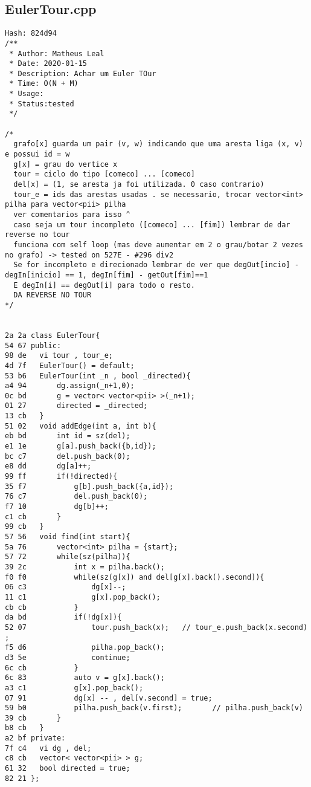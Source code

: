 \documentclass[11pt, a4paper, twoside]{article}
\begin{document}
\subsection{EulerTour.cpp}
\begin{lstlisting}
Hash: 824d94
/**
 * Author: Matheus Leal
 * Date: 2020-01-15
 * Description: Achar um Euler TOur
 * Time: O(N + M)
 * Usage: 
 * Status:tested
 */

/*
  grafo[x] guarda um pair (v, w) indicando que uma aresta liga (x, v) e possui id = w
  g[x] = grau do vertice x
  tour = ciclo do tipo [comeco] ... [comeco]
  del[x] = (1, se aresta ja foi utilizada. 0 caso contrario)
  tour_e = ids das arestas usadas . se necessario, trocar vector<int> pilha para vector<pii> pilha
  ver comentarios para isso ^
  caso seja um tour incompleto ([comeco] ... [fim]) lembrar de dar reverse no tour
  funciona com self loop (mas deve aumentar em 2 o grau/botar 2 vezes no grafo) -> tested on 527E - #296 div2
  Se for incompleto e direcionado lembrar de ver que degOut[incio] - degIn[inicio] == 1, degIn[fim] - getOut[fim]==1
  E degIn[i] == degOut[i] para todo o resto. 
  DA REVERSE NO TOUR
*/


2a 2a class EulerTour{	
54 67 public:
98 de 	vi tour , tour_e;
4d 7f 	EulerTour() = default;
53 b6 	EulerTour(int _n , bool _directed){ 
a4 94 		dg.assign(_n+1,0);
0c bd 		g = vector< vector<pii> >(_n+1);
01 27 		directed = _directed;
13 cb 	}
51 02 	void addEdge(int a, int b){
eb bd 		int id = sz(del);
e1 1e 		g[a].push_back({b,id});
bc c7 		del.push_back(0);
e8 dd 		dg[a]++;
99 ff 		if(!directed){
35 f7 			g[b].push_back({a,id});
76 c7 			del.push_back(0);
f7 10 			dg[b]++;
c1 cb 		}
99 cb 	}
57 56 	void find(int start){
5a 76 	    vector<int> pilha = {start};
57 72 	    while(sz(pilha)){
39 2c 	        int x = pilha.back();
f0 f0 	        while(sz(g[x]) and del[g[x].back().second]){
06 c3 	            dg[x]--;
11 c1 	            g[x].pop_back();
cb cb 	        }
da bd 	        if(!dg[x]){
52 07 	            tour.push_back(x); 	 // tour_e.push_back(x.second) ;
f5 d6 	            pilha.pop_back();
d3 5e 	            continue;
6c cb 	        }
6c 83 	        auto v = g[x].back();
a3 c1 	        g[x].pop_back();
07 91 	        dg[x] -- , del[v.second] = true;
59 b0 	        pilha.push_back(v.first); 	    // pilha.push_back(v)
39 cb 	    }		
b8 cb 	}
a2 bf private:
7f c4 	vi dg , del;
c8 cb 	vector< vector<pii> > g;
61 32 	bool directed = true;
82 21 };
\end{lstlisting}
\end{document}
